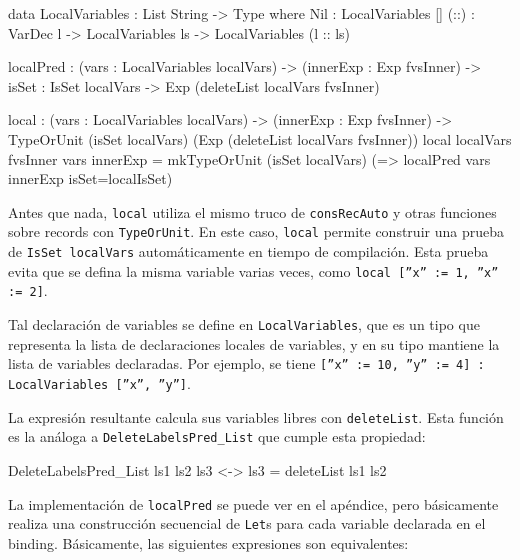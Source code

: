 \begin{code}
data LocalVariables : List String -> Type where
  Nil : LocalVariables []
  (::) : VarDec l -> LocalVariables ls ->
    LocalVariables (l :: ls)

localPred : (vars : LocalVariables localVars) ->
  (innerExp : Exp fvsInner) -> {isSet : IsSet localVars} ->
  Exp (deleteList localVars fvsInner)

local : (vars : LocalVariables localVars) -> (innerExp : Exp fvsInner) ->
  TypeOrUnit (isSet localVars) (Exp (deleteList localVars fvsInner))
local {localVars} {fvsInner} vars innerExp =
  mkTypeOrUnit (isSet localVars)
    (\localIsSet => localPred vars innerExp {isSet=localIsSet})
\end{code}

Antes que nada, \texttt{local} utiliza el mismo truco de \texttt{consRecAuto} y otras funciones sobre records con \texttt{TypeOrUnit}. En este caso, \texttt{local} permite construir una prueba de \texttt{IsSet localVars} automáticamente en tiempo de compilación. Esta prueba evita que se defina la misma variable varias veces, como \texttt{local [''x'' := 1, ''x'' := 2]}.

Tal declaración de variables se define en \texttt{LocalVariables}, que es un tipo que representa la lista de declaraciones locales de variables, y en su tipo mantiene la lista de variables declaradas. Por ejemplo, se tiene \texttt{[''x'' := 10, ''y'' := 4] : LocalVariables [''x'', ''y'']}.

La expresión resultante calcula sus variables libres con \texttt{deleteList}. Esta función es la análoga a \texttt{DeleteLabelsPred\_List} que cumple esta propiedad:

\begin{code}
DeleteLabelsPred_List ls1 ls2 ls3 <-> ls3 = deleteList ls1 ls2
\end{code}

La implementación de \texttt{localPred} se puede ver en el apéndice, pero básicamente realiza una construcción secuencial de \texttt{Let}s para cada variable declarada en el binding. Básicamente, las siguientes expresiones son equivalentes:


